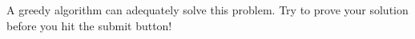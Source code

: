 A greedy algorithm can adequately solve this problem. Try to prove your solution before you hit the submit button!